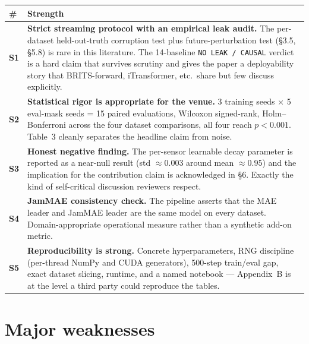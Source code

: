 \documentclass[11pt]{article}
\begin{document}
\begin{tabularx}{\linewidth}{@{}lX@{}}
\toprule
\textbf{\#} & \textbf{Strength} \\
\midrule
\textbf{S1} & \textbf{Strict streaming protocol with an empirical leak
              audit.}  The per-dataset held-out-truth corruption test
              plus future-perturbation test (\S3.5, \S5.8) is rare in
              this literature.  The 14-baseline
              \texttt{NO LEAK / CAUSAL} verdict is a hard claim that
              survives scrutiny and gives the paper a deployability
              story that BRITS-forward, iTransformer, etc.\ share but
              few discuss explicitly. \\[4pt]
\textbf{S2} & \textbf{Statistical rigor is appropriate for the venue.}
              3 training seeds $\times$ 5 eval-mask seeds = 15 paired
              evaluations, Wilcoxon signed-rank, Holm--Bonferroni across
              the four dataset comparisons, all four reach
              $p < 0.001$.  Table~3 cleanly separates the headline
              claim from noise. \\[4pt]
\textbf{S3} & \textbf{Honest negative finding.}  The per-sensor
              learnable decay parameter is reported as a near-null
              result (std $\approx 0.003$ around mean $\approx 0.95$)
              and the implication for the contribution claim is
              acknowledged in \S6.  Exactly the kind of self-critical
              discussion reviewers respect. \\[4pt]
\textbf{S4} & \textbf{JamMAE consistency check.}  The pipeline asserts
              that the MAE leader and JamMAE leader are the same model
              on every dataset.  Domain-appropriate operational measure
              rather than a synthetic add-on metric. \\[4pt]
\textbf{S5} & \textbf{Reproducibility is strong.}  Concrete
              hyperparameters, RNG discipline (per-thread NumPy and
              CUDA generators), 500-step train/eval gap, exact dataset
              slicing, runtime, and a named notebook --- Appendix~B is
              at the level a third party could reproduce the tables. \\
\bottomrule
\end{tabularx}

\section{Major weaknesses}
\end{document}
